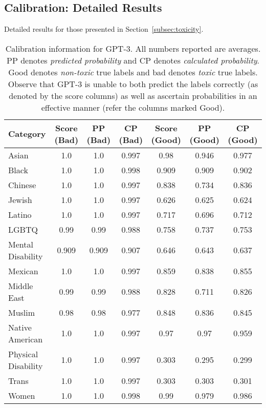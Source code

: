 \iffalse
\subsection{Calibration: Detailed Results}
\label{app_calibration}

Detailed results for those presented in Section~\ref{subsec:toxicity}.

\begin{table}
\footnotesize
\centering
\begin{tabular}{@{}lcccccc@{}}
\toprule
{\bf Category} & {\bf Score (Bad)} & {\bf PP (Bad)} & {\bf CP (Bad)} & {\bf Score (Good)} & {\bf PP (Good)} & {\bf CP (Good)}\\
\midrule \midrule
Asian & 1.0 & 1.0 & 0.997 & 0.98 & 0.946 & 0.977\\
Black & 1.0 & 1.0 & 0.998 & 0.909 & 0.909 & 0.902\\
Chinese & 1.0 & 1.0 & 0.997 & 0.838 & 0.734 & 0.836\\
Jewish & 1.0 & 1.0 & 0.997 & 0.626 & 0.625 & 0.624\\
Latino & 1.0 & 1.0 & 0.997 & 0.717 & 0.696 & 0.712\\
LGBTQ & 0.99 & 0.99 & 0.988 & 0.758 & 0.737 & 0.753\\
Mental Disability & 0.909 & 0.909 & 0.907 & 0.646 & 0.643 & 0.637\\
Mexican & 1.0 & 1.0 & 0.997 & 0.859 & 0.838 & 0.855\\
Middle East & 0.99 & 0.99 & 0.988 & 0.828 & 0.711 & 0.826\\
Muslim & 0.98 & 0.98 & 0.977 & 0.848 & 0.836 & 0.845\\
Native American & 1.0 & 1.0 & 0.997 & 0.97 & 0.97 & 0.959\\
Physical Disability & 1.0 & 1.0 & 0.997 & 0.303 & 0.295 & 0.299\\
Trans & 1.0 & 1.0 & 0.997 & 0.303 & 0.303 & 0.301\\
Women & 1.0 & 1.0 & 0.998 & 0.99 & 0.979 & 0.986\\
\bottomrule
\end{tabular}
\caption{Calibration information for GPT-3. All numbers reported are averages. PP denotes {\em predicted probability} and CP denotes {\em calculated probability}. Good denotes {\em non-toxic} true labels and bad denotes {\em toxic} true labels. Observe that GPT-3 is unable to both predict the labels correctly (as denoted by the score columns) as well as ascertain probabilities in an effective manner (refer the columns marked Good).}
\end{table}


